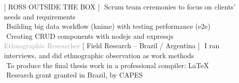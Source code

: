 \begin{cvtable}
%
	{[ R{\scriptsize OSS} O{\scriptsize UTSIDE THE} B{\scriptsize OX} ]}{
        \textperiodcentered $ $ Scrum team ceremonies to focus on clients' needs and requirements \\        
        \textperiodcentered $ $ Building big data workflow (knime) with testing performance (e2e) \\        
        \textperiodcentered $ $ Creating CRUD components with nodejs and expressjs \\
        }  
% 
	{%
	\textcolor{darkgray}{%
    Ethnographic Researcher
	}}
	{
    [ Field Research -- Brazil / Argentina ]%
	}
	{
        \textperiodcentered $ $ I ran interviews, and did ethnographic observation as work methods \\
        \textperiodcentered $ $ To produce the final thesis work in a professional compiler: \LaTeX \\
        \textperiodcentered $ $ Research grant granted in Brazil, by CAPES \\ 
	\wt{%
	}
	}
	

\end{cvtable}

